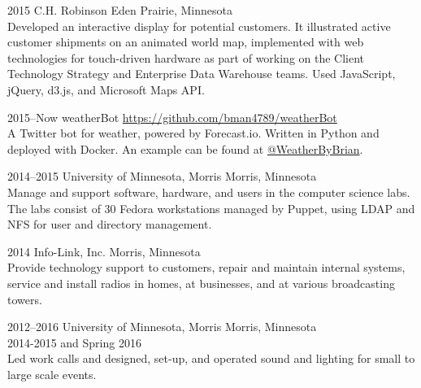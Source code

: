 \documentclass[]{cv-style} %
\begin{document}
\begin{entrylist}

\entry
{2015}
{C.H. Robinson}
{Eden Prairie, Minnesota}
{ \\
Developed an interactive display for potential customers. It illustrated active customer shipments on an animated world map, implemented with web technologies for touch-driven hardware as part of working on the Client Technology Strategy and Enterprise Data Warehouse teams. Used JavaScript, jQuery, d3.js, and Microsoft Maps API.}


\entry
{2015--Now}
{weatherBot}
{\href{https://github.com/bman4789/weatherBot}{https://github.com/bman4789/weatherBot}}
{ \\
A Twitter bot for weather, powered by Forecast.io. Written in Python and deployed with Docker. An example can be found at \href{https://twitter.com/WeatherByBrian}{@WeatherByBrian}.}


\entry
{2014--2015}
{University of Minnesota, Morris}
{Morris, Minnesota}
{ \\
Manage and support software, hardware, and users in the computer science labs. The labs consist of 30 Fedora workstations managed by Puppet, using LDAP and NFS for user and directory management.}


\entry
{2014}
{Info-Link, Inc.}
{Morris, Minnesota}
{ \\
Provide technology support to customers, repair and maintain internal systems, service and install radios in homes, at businesses, and at various broadcasting towers.}


\entry
{2012--2016}
{University of Minnesota, Morris}
{Morris, Minnesota}
{ \\
 2014-2015 and Spring 2016 \\
Led work calls and designed, set-­up, and operated sound and lighting for small to large scale events.
}


\end{entrylist}
\end{document}
